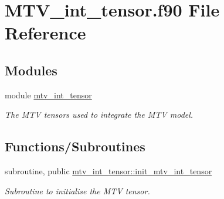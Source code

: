 \hypertarget{MTV__int__tensor_8f90}{}\section{M\+T\+V\+\_\+int\+\_\+tensor.\+f90 File Reference}
\label{MTV__int__tensor_8f90}
\subsection*{Modules}
\begin{DoxyCompactItemize}
\item 
module \hyperlink{namespacemtv__int__tensor}{mtv\+\_\+int\+\_\+tensor}
\begin{DoxyCompactList}\small\item\em The M\+TV tensors used to integrate the M\+TV model. \end{DoxyCompactList}\end{DoxyCompactItemize}
\subsection*{Functions/\+Subroutines}
\begin{DoxyCompactItemize}
\item 
subroutine, public \hyperlink{namespacemtv__int__tensor_a5b3112e973892c80810cbff003525946}{mtv\+\_\+int\+\_\+tensor\+::init\+\_\+mtv\+\_\+int\+\_\+tensor}
\begin{DoxyCompactList}\small\item\em Subroutine to initialise the M\+TV tensor. \end{DoxyCompactList}\end{DoxyCompactItemize}
